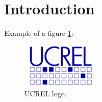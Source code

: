 \section{Introduction}
Example of a figure \ref{fig:conclusion}:
\begin{figure}[!h]
    \centering
    \includegraphics[scale=0.8]{figures/conclusion/ucrel_logo.png}
    \caption{UCREL logo.}
    \label{fig:conclusion}
\end{figure}